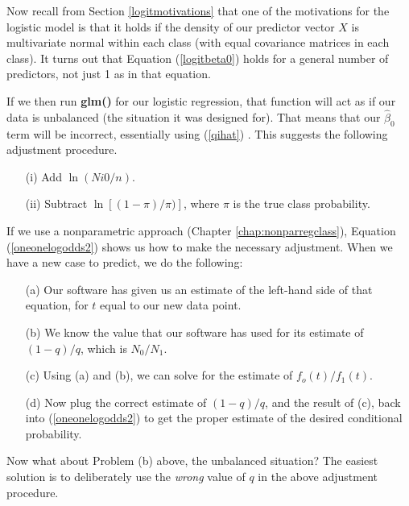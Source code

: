 Now recall from Section \ref{logitmotivations} that one of the
motivations for the logistic model is that it holds if the density of
our predictor vector $X$ is multivariate normal within each class (with
equal covariance matrices in each class).  It turns out that Equation
(\ref{logitbeta0}) holds for a general number of predictors, not just 1
as in that equation.  

If we then run {\bf glm()} for our logistic regression, that function
will act as if our data is unbalanced (the situation it was designed
for).  That means that our $\widehat{\beta}_0$ term will be incorrect,
essentially using (\ref{qihat}) .  This suggests the following
adjustment procedure.

\begin{itemize}

\item[(i)] Add $\ln(Ni0/n)$.

\item[(ii)] Subtract $\ln[(1-\pi)/\pi)]$, where $\pi$ is the true class
probability.

\end{itemize}

If we use a nonparametric approach (Chapter \ref{chap:nonparregclass}),
Equation (\ref{oneonelogodds2}) shows us how to make the necessary
adjustment.  When we have a new case to predict, we do the following:

\begin{itemize}

\item [(a)] Our software has given us an estimate of the left-hand side
of that equation, for $t$ equal to our new data point.

\item [(b)] We know the value that our software has used for its
estimate of $(1-q)/q$, which is $N_0/N_1$.

\item [(c)] Using (a) and (b), we can solve for the estimate of
$f_o(t)/f_1(t)$.

\item [(d)] Now plug the correct estimate of $(1-q)/q$, and the result
of (c), back into (\ref{oneonelogodds2}) to get the proper estimate of
the desired conditional probability.

\end{itemize}

Now what about Problem (b) above, the unbalanced situation?  The easiest
solution is to deliberately use the {\it wrong} value of $q$ in the
above adjustment procedure.

